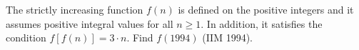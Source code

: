 The strictly increasing function $f(n)$ is defined on the positive integers and it assumes positive integral values for all $n \geq 1$. In addition, it satisfies the condition $f[f(n)] = 3 \cdot n$. Find $f(1994)$ (IIM 1994).
